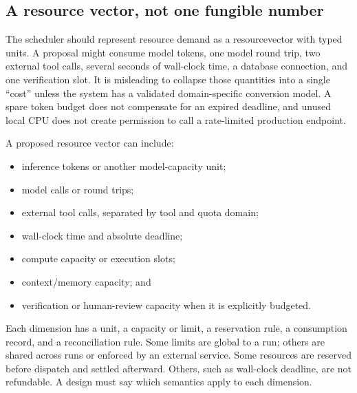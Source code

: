 \subsection{A resource vector, not one fungible number}
\label{sec:ch16-resource-vector}

\EngineeringLabel{} The scheduler should represent resource demand as a \gls{resourcevector} with typed units. A proposal might consume model tokens, one model round trip, two external tool calls, several seconds of wall-clock time, a database connection, and one verification slot. It is misleading to collapse those quantities into a single ``cost'' unless the system has a validated domain-specific conversion model. A spare token budget does not compensate for an expired deadline, and unused local CPU does not create permission to call a rate-limited production endpoint.

A proposed resource vector can include:

\begin{itemize}
  \item inference tokens or another model-capacity unit;
  \item model calls or round trips;
  \item external tool calls, separated by tool and quota domain;
  \item wall-clock time and absolute deadline;
  \item compute capacity or execution slots;
  \item context/memory capacity; and
  \item verification or human-review capacity when it is explicitly budgeted.
\end{itemize}

Each dimension has a unit, a capacity or limit, a reservation rule, a consumption record, and a reconciliation rule. Some limits are global to a run; others are shared across runs or enforced by an external service. Some resources are reserved before dispatch and settled afterward. Others, such as wall-clock deadline, are not refundable. A design must say which semantics apply to each dimension.

